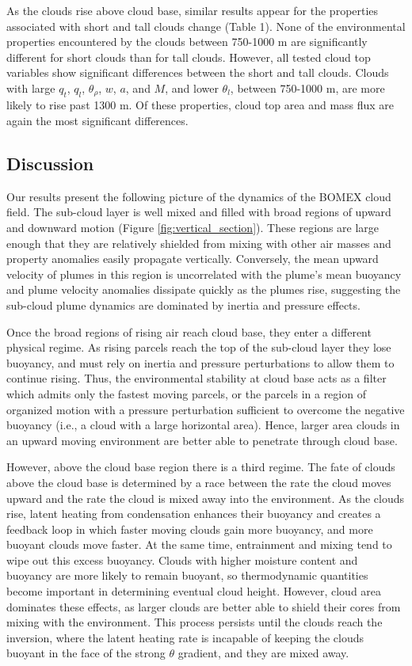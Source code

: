 \documentclass[acp]{copernicus}
\begin{document}
As the clouds rise above cloud base, similar results appear for the properties
associated with short and tall clouds change (Table 1). None of the 
environmental properties encountered by the clouds between 750-1000 m are significantly different for short clouds than for tall clouds.  However, all 
tested cloud top variables show significant differences between the short and 
tall clouds.  Clouds with large $q_t$, $q_l$, $\theta_\rho$, $w$, $a$, and 
$M$, and lower $\theta_l$, between 750-1000 m, are more likely to rise past 
1300 m.  Of these properties, cloud top area and mass flux are again the most
significant differences.

\subsection{Discussion}

Our results present the following picture of the dynamics of the BOMEX cloud 
field.  The sub-cloud layer is well mixed and filled with broad regions of 
upward and downward motion (Figure \ref{fig:vertical_section}).  These regions 
are large enough that they are relatively shielded from mixing with other air 
masses and property anomalies easily propagate vertically.  Conversely, the 
mean upward velocity of plumes in this region is uncorrelated with the plume's 
mean buoyancy and plume velocity anomalies dissipate quickly as the plumes 
rise, suggesting the sub-cloud plume dynamics are dominated by inertia and 
pressure effects.

Once the broad regions of rising air reach cloud base, they enter a different 
physical regime.  As rising parcels reach the top of the sub-cloud layer they 
lose buoyancy, and must rely on inertia and pressure perturbations to 
allow them to continue rising.  Thus, the environmental stability at cloud base 
acts as a filter which admits only the fastest moving parcels, or the parcels 
in a region of organized motion with a pressure perturbation sufficient to 
overcome the negative buoyancy (i.e., a cloud with a large horizontal area).  
Hence, larger area clouds in an upward moving environment are better able to
penetrate through cloud base.

However, above the cloud base region there is a third regime.  The fate of 
clouds above the cloud base is determined by a race between the rate the cloud 
moves upward and the rate the cloud is mixed away into the environment.  As the 
clouds rise, latent heating from condensation enhances their buoyancy and 
creates a feedback loop in which faster moving clouds gain more buoyancy, and 
more buoyant clouds move faster.  At the same time, entrainment and mixing 
tend to wipe out this excess buoyancy.  Clouds with higher moisture content and 
buoyancy are more likely to remain buoyant, so thermodynamic quantities become 
important in determining eventual cloud height.  However, cloud area dominates 
these effects, as larger clouds are better able to shield their cores from 
mixing with the environment.  This process persists until the clouds reach the 
inversion, where the latent heating rate is incapable of keeping the clouds 
buoyant in the face of the strong $\theta$ gradient, and they are mixed 
away.
\end{document}
